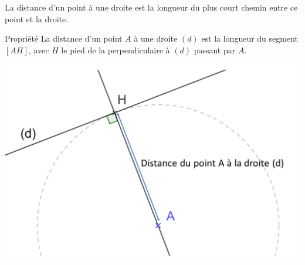 \documentclass[xcolor={dvipsnames}]{beamer}
\begin{document}
\begin{frame}
	\begin{mydef}
		La distance d’un point à une droite \pause est la longueur du plus court chemin \pause entre ce point et la droite. \pause		
	\end{mydef}

	\begin{alertblock}{Propriété}
			La distance d’un point $A$ à une droite $(d)$ \pause  est la longueur du segment $[AH]$, avec \pause $H$ le pied de la perpendiculaire à $(d)$ passant par $A$. \pause
	\end{alertblock}

	\begin{center}
		\includegraphics[scale=0.25]{lgr_droite}
	\end{center}
\end{frame}
%
%
%
%
%		
%			
\end{document}
